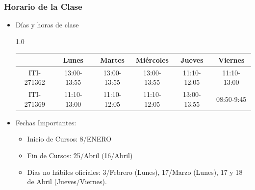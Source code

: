 \begin{frame}
\frametitle{Horario de la Clase}


\begin{itemize}
\item Días y horas de clase
\tiny
\begin{spacing}{1.0}
\begin{center}
\begin{tabular}{c|ccccc}
\hline 
          & Lunes        & Martes      & Miércoles   & Jueves        & Viernes      \\  \hline 
ITI-271362 & 13:00-13:55 & 13:00-13:55 & 13:00-13:55 &  11:10-12:05  & 11:10-13:00  \\            
ITI-271369 & 11:10-13:00 & 11:10-12:05 & 11:10-12:05 &  13:00-13:55  & 08:50-9:45  \\            
\hline
\end{tabular}
\end{center}
\end{spacing}
\normalsize
\item Fechas Importantes:
\begin{itemize}
\item Inicio de Cursos: 8/ENERO
\item Fin de Cursos: 25/Abril (16/Abril)
\item Dias no hábiles oficiales: 3/Febrero (Lunes), 17/Marzo (Lunes), 17 y 18 de Abril (Jueves/Viernes). 
\end{itemize}
\end{itemize}

\end{frame}



